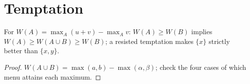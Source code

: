\section{Temptation}
\label{sec:beh-gp}

\begin{theorem}
\label{thm:beh-gp}
\leanok
For $W(A)=\max_A(u+v)-\max_Av$: $W(A)\ge W(B)$ implies $W(A)\ge W(A\cup B)\ge W(B)$; a resisted temptation makes
$\{x\}$ strictly better than $\{x,y\}$.
\end{theorem}
\begin{proof}
\leanok
$W(A\cup B)=\max(a,b)-\max(\alpha,\beta)$; check the four cases of which menu attains each maximum.
\end{proof}


